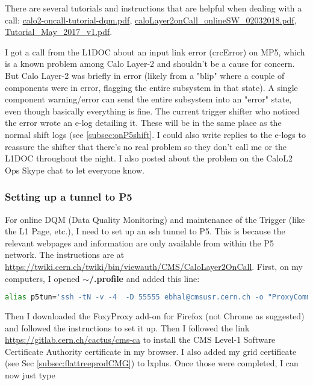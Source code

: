 There are several tutorials and instructions that are helpful when dealing with a call: \href{run:./sec33/calo2-oncall-tutorial-dqm.pdf}{calo2-oncall-tutorial-dqm.pdf}, \href{run:./sec33/caloLayer2onCall_onlineSW_02032018.pdf}{caloLayer2onCall\_onlineSW\_02032018.pdf}, \href{run:./sec33/Tutorial_May_2017_v1.pdf}{Tutorial\_May\_2017\_v1.pdf}.

I got a call from the L1DOC about an input link error (crcError) on MP5, which is a known problem among Calo Layer-2 and shouldn't be a cause for concern. But Calo Layer-2 was briefly in error (likely from a "blip" where a couple of components were in error, flagging the entire subsystem in that state). A single component warning/error can send the entire subsystem into an "error" state, even though basically everything is fine. The current trigger shifter who noticed the error wrote an e-log detailing it. These will be in the same place as the normal shift logs (see \ref{subsec:onP5shift}. I could also write replies to the e-logs to reassure the shifter that there's no real problem so they don't call me or the L1DOC throughout the night. I also posted about the problem on the CaloL2 Ops Skype chat to let everyone know.


\subsubsection{Setting up a tunnel to P5}

For online DQM (Data Quality Monitoring) and maintenance of the Trigger (like the L1 Page, etc.), I need to set up an ssh tunnel to P5. This is because the relevant webpages and information are only available from within the P5 network. The instructions are at \url{https://twiki.cern.ch/twiki/bin/viewauth/CMS/CaloLayer2OnCall}. First, on my computers, I opened \textbf{$\sim$/.profile} and added this line:

\begin{lstlisting}[belowskip=-0.7cm, language=sh, numbers=none]
alias p5tun='ssh -tN -v -4  -D 55555 ebhal@cmsusr.cern.ch -o "ProxyCommand=ssh ebhal@lxplus.cern.ch -W %h:%p"'
\end{lstlisting}

Then I downloaded the FoxyProxy add-on for Firefox (not Chrome as suggested) and followed the instructions to set it up. Then I followed the link \url{https://gitlab.cern.ch/cactus/cms-ca} to install the CMS Level-1 Software Certificate Authority certificate in my browser. I also added my grid certificate (see Sec \ref{subsec:flattreeprodCMG}) to lxplus. Once those were completed, I can now just type

